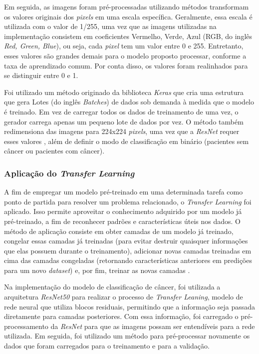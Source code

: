 Em seguida, as imagens foram pré-processadas utilizando métodos transformam os valores originais dos \textit{pixels} em uma escala específica. Geralmente, essa escala é utilizada com o valor de 1/255, uma vez que as imagens utilizadas na implementação consistem em coeficientes Vermelho, Verde, Azul (RGB, do inglês \textit{Red, Green, Blue}), ou seja, cada \textit{pixel} tem um valor entre 0 e 255. Entretanto, esses valores são grandes demais para o modelo proposto processar, conforme a taxa de aprendizado comum. Por conta disso, os valores foram realinhados para se distinguir entre 0 e 1.

Foi utilizado um método originado da biblioteca \textit{Keras} que cria uma estrutura que gera Lotes (do inglês \textit{Batches}) de dados sob demanda à medida que o modelo é treinado. Em vez de carregar todos os dados de treinamento de uma vez, o gerador carrega apenas um pequeno lote de dados por vez. O método também redimensiona das imagens para 224x224 \textit{pixels}, uma vez que a \textit{ResNet} requer esses valores \cite{kerasresnet50}, além de definir o modo de classificação em binário (pacientes sem câncer ou pacientes com câncer).



\subsubsection{\esp Aplicação do \textit{Transfer Learning}} \label{transfer}

A fim de empregar um modelo pré-treinado em uma determinada tarefa como ponto de partida para resolver um problema relacionado, o \textit{Transfer Learning} foi aplicado. Isso permite aproveitar o conhecimento adquirido por um modelo já pré-treinado, a fim de reconhecer padrões e características úteis nos dados. O método de aplicação consiste em obter camadas de um modelo já treinado, congelar essas camadas já treinadas (para evitar destruir quaisquer informações que elas possuem durante o treinamento), adicionar novas camadas treinadas em cima das camadas congeladas (retornando características anteriores em predições para um novo \textit{dataset}) e, por fim, treinar as novas camadas \cite{kerastransfer}.

Na implementação do modelo de classificação de câncer, foi utilizada a arquitetura \textit{ResNet50} para realizar o processo de \textit{Transfer Leaning}, modelo de rede neural que utiliza blocos residuais, permitindo que a informação seja passada diretamente para camadas posteriores. Com essa informação, foi carregado o pré-processamento da \textit{ResNet} para que as imagens possam ser entendíveis para a rede utilizada. Em seguida, foi utilizado um método para pré-processar novamente os dados que foram carregados para o treinamento e para a validação.


